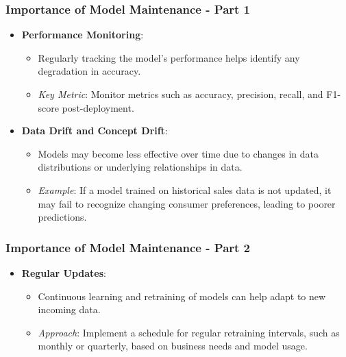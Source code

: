 \documentclass[aspectratio=169]{beamer}
\begin{document}
\begin{frame}[fragile]
    \frametitle{Importance of Model Maintenance - Part 1}
    \begin{itemize}
        \item \textbf{Performance Monitoring}:
            \begin{itemize}
                \item Regularly tracking the model’s performance helps identify any degradation in accuracy.
                \item \textit{Key Metric}: Monitor metrics such as accuracy, precision, recall, and F1-score post-deployment.
            \end{itemize}

        \item \textbf{Data Drift and Concept Drift}:
            \begin{itemize}
                \item Models may become less effective over time due to changes in data distributions or underlying relationships in data.
                \item \textit{Example}: If a model trained on historical sales data is not updated, it may fail to recognize changing consumer preferences, leading to poorer predictions.
            \end{itemize}
    \end{itemize}
\end{frame}

\begin{frame}[fragile]
    \frametitle{Importance of Model Maintenance - Part 2}
    \begin{itemize}
        \item \textbf{Regular Updates}:
            \begin{itemize}
                \item Continuous learning and retraining of models can help adapt to new incoming data.
                \item \textit{Approach}: Implement a schedule for regular retraining intervals, such as monthly or quarterly, based on business needs and model usage.
            \end{itemize}
    \end{itemize}
\end{frame}
\end{document}
